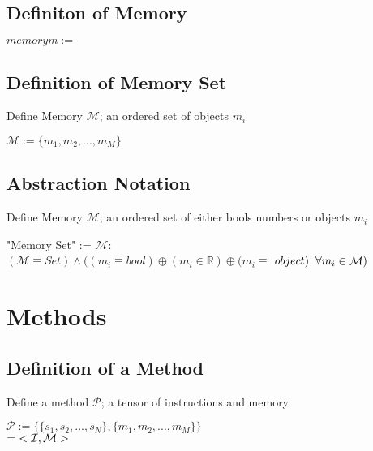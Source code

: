 \documentclass[11pt]{article}
\begin{document}
\subsection{Definiton of Memory}
\begin{center}
$
memory m :=
$
\end{center}







\subsection{Definition of Memory Set}
Define Memory $\mathcal{M}$; an ordered set of objects $m_i$
\begin{center}
$\mathcal{M} := \{m_1,m_2,...,m_M\}$
\end{center}




\subsection{Abstraction Notation}
Define Memory $\mathcal{M}$; an ordered set of either bools numbers or objects $m_i$
\begin{center}
"Memory Set" := $\mathcal{M}:$
\\ \vspace{2mm}
$
(\mathcal{M} \equiv Set) \land((m_i \equiv bool) \oplus (m_i \in \mathbb{R}) \oplus (m_i \equiv$ $object) \hspace{2mm} \forall m_i \in \mathcal{M})
$
\end{center}










\newpage

\section{Methods}
\subsection{Definition of a Method}
Define a method $\mathcal{P}$; a tensor of instructions and memory
\begin{center}
$
\mathcal{P} := \{ \{s_1, s_2,...,s_{N}\}, \{m_1, m_2,...,m_M\} \}
$
\\ \vspace{2mm}
$
= \hspace{1mm} < \mathcal{I}, \mathcal{M} >
$
\end{center}
\end{document}
